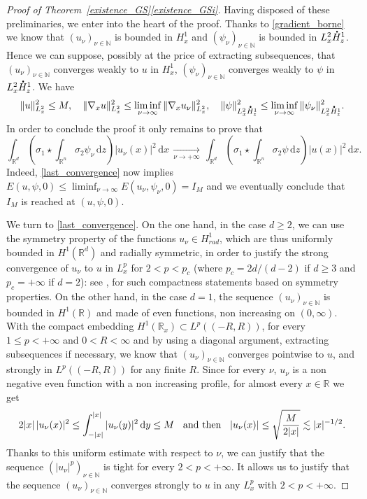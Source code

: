 \documentclass[JEP,XML,SOM,NoEqCountersInSection,NoFloatCountersInSection,Unicode,published]{cedram}
\theoremstyle{definition}
\newcommand*{\overbigdot}[1]{%
\accentset{\mbox{\large\bfseries .}}{#1}}
\newenvironment{ProofOf}[1]{\begin{proof}[Proof of #1]}{\end{proof}}
\newcommand{\R}{\mathbb{R}}
\newcommand{\ud}{\, {\mathrm{d}}}
\begin{document}
\begin{ProofOf}{Theorem~\ref{existence_GS}\eqref{existence_GSi}}
Having disposed of these preliminaries, we enter into the heart of the proof. Thanks to \eqref{gradient_borne} we know that $(u_{\nu})_{\nu\in \mathbb N}$ is bounded in $H_{x}^{1}$ and $(\psi_{\nu})_{\nu\in \mathbb N}$ is bounded in $L_{x}^{2}\overbigdot{H}_{z}^{1}$. Hence we can suppose, possibly at the price of extracting subsequences, that $(u_{\nu})_{\nu\in \mathbb N}$ converges weakly to $u$ in $H_{x}^{1}$, $(\psi_{\nu})_{\nu\in \mathbb N}$ converges weakly to $\psi$ in $L_{x}^{2}\overbigdot{H}_{z}^{1}$. We have
\[
\|u\|_{L_{x}^{2}}^{2}\leq M,\quad \|\nabla_{x}u\|_{L_{x}^{2}}^{2}\leq\liminf_{\nu\to \infty}\|\nabla_{x}u_{\nu}\|_{L_{x}^{2}}^{2},\quad \|\psi\|_{L_{x}^{2}\overbigdot{H}_{z}^{1}}^{2}\leq\liminf_{\nu\to \infty}\|\psi_{\nu}\|_{L_{x}^{2}\overbigdot{H}_{z}^{1}}^{2}.
\]
In order to conclude the proof it only remains to prove that\vspace*{-3pt}
\begin{equation}\label{last_convergence}
\int_{\R^{d}}\left(\sigma_{1}\star\int_{\R^{n}}\sigma_{2}\psi_{\nu}\ud z\right)|u_{\nu}(x)|^{2}\ud x\,\underset{\nu\to +\infty}{\to}\,\int_{\R^{d}}\left(\sigma_{1}\star\int_{\R^{n}}\sigma_{2}\psi\ud z\right)|u(x)|^{2}\ud x.
\end{equation}
Indeed, \eqref{last_convergence} now implies $E(u,\psi,0)\leq\liminf_{\nu\to\infty} E(u_{\nu},\psi_{\nu},0)=I_{M}$ and we eventually conclude that $I_{M}$ is reached at $(u,\psi,0)$.

We turn to \eqref{last_convergence}. On the one hand, in the case $d\geq 2$,
we can use the symmetry property of the functions $u_{\nu}\in H_{rad}^{1}$,
which are thus uniformly bounded in $H^1(\mathbb R^d)$ and radially symmetric,
in order to justify the strong convergence of $u_{\nu}$ to $u$ in $L_{x}^{p}$ for $2<p<p_{c}$ (where $p_{c}=2d/(d-2)$ if $d\geq 3$ and $p_{c}=+\infty$ if $d=2$):
see \cite[Prop.\,1.1]{Pllsc}, \cite[Radial Lem.\,1]{Strauss} for such compactness statements based on symmetry properties. On the other hand, in the case $d=1$,
the sequence $(u_{\nu})_{\nu\in \mathbb N}$ is bounded in $H^1(\mathbb R)$
and made of even functions, non increasing on $(0,\infty)$.
With the compact embedding
$H^{1}(\R_{x})\subset L^{p}((-R,R))$, for every $1\leq p<+\infty$ and $0<R<\infty$
and by using a diagonal argument, extracting subsequences if necessary, we know that $(u_{\nu})_{\nu\in\mathbb N}$ converges pointwise to $u$, and strongly in $L^p((-R,R))$ for any finite $R$.
Since for every $\nu$, $u_{\nu}$ is a non negative even function with a non increasing profile, for almost every
$x\in\R$ we get
\[
2|x|\,|u_{\nu}(x)|^{2}\leq\int_{-|x|}^{|x|}|u_{\nu}(y)|^{2}\ud y\leq M \hspace{0.2cm}\text{ and then }\hspace{0.2cm} |u_{\nu}(x)|\leq\sqrt{\frac{M}{2|x|}}\lesssim|x|^{-1/2}.
\]
Thanks to this uniform estimate with respect to $\nu$, we can justify that the sequence $(|u_{\nu}|^{p})_{\nu\in \mathbb N}$ is tight for every $2<p<+\infty$.
It
allows us to justify that the sequence $(u_{\nu})_{\nu\in \mathbb N}$ converges strongly to $u$ in any $L_{x}^{p}$ with $2<p<+\infty$.


\end{ProofOf}
\end{document}
